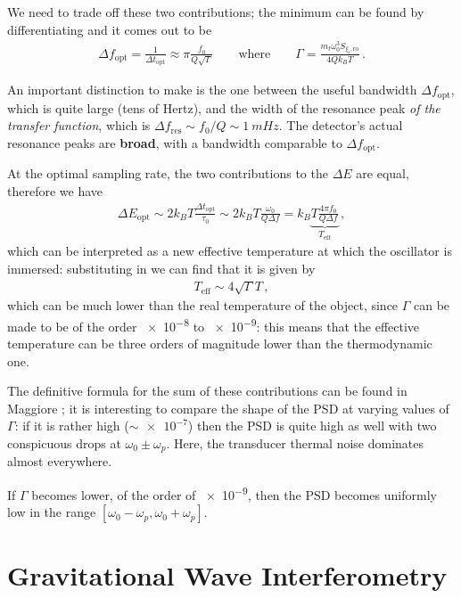 \documentclass[main.tex]{subfiles}
\begin{document}
We need to trade off these two contributions; the minimum can be found by differentiating and it comes out to be 
%
\begin{align}
\Delta f _{\text{opt}} = \frac{1}{\Delta t _{\text{opt}}} \approx
\pi \frac{f_0 }{Q \sqrt{\Gamma }}
\qquad \text{where} \qquad
\Gamma = \frac{m_t \omega_0^3  S_{\xi_t, \text{ro}}}{4Q k_B T} 
\,.
\end{align}
%

An important distinction to make is the one between the useful bandwidth \(\Delta f _{\text{opt}}\), which is quite large (tens of Hertz), and the width of the resonance peak \emph{of the transfer function}, which is \(\Delta f _{\text{res}} \sim f_0 / Q \sim \SI{1}{mHz}\). 
The detector's actual resonance peaks are \textbf{broad}, with a bandwidth comparable to \(\Delta f _{\text{opt}}\).

At the optimal sampling rate, the two contributions to the \(\Delta E\) are equal, therefore we have 
%
\begin{align}
\Delta E _{\text{opt}} \sim 2 k_B T \frac{\Delta t _{\text{opt}}}{\tau_0 }
\sim 2 k_B T \frac{\omega_0}{Q \Delta f} 
= k_B \underbrace{T \frac{4 \pi f_0 }{Q \Delta f}}_{T _{\text{eff}}}
\,,
\end{align}
%
which can be interpreted as a new effective temperature at which the oscillator is immersed: substituting in we can find that it is given by 
%
\begin{align}
T _{\text{eff}} \sim 4 \sqrt{\Gamma } T
\,,
\end{align}
%
which can be much lower than the real temperature of the object, since \(\Gamma \) can be made to be of the order \num{e-8} to \num{e-9}: this means that the effective temperature can be three orders of magnitude lower than the thermodynamic one.

The definitive formula for the sum of these contributions can be found in Maggiore \cite[eq.\ 8.150]{maggioreGravitationalWavesVolume2007}; it is interesting to compare the shape of the PSD at varying values of \(\Gamma \): if it is rather high (\(\sim \num{e-7}\)) then the PSD is quite high as well with two conspicuous drops at \(\omega_0 \pm \omega_{p}\). Here, the transducer thermal noise dominates almost everywhere.

If \(\Gamma \) becomes lower, of the order of \num{e-9}, then the PSD becomes uniformly low in the range \([\omega_0 - \omega_{p}, \omega_0 + \omega_{p}]\).

\section{Gravitational Wave Interferometry}
\end{document}

